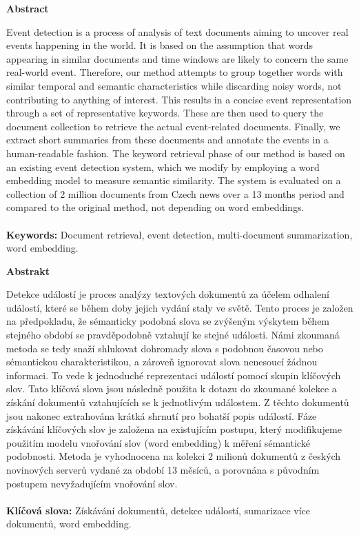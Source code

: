 \thispagestyle{plain}

\begin{center}
	\Large
	\textbf{Abstract}
\end{center}

Event detection is a process of analysis of text documents aiming to uncover real events happening in the world. It is based on the assumption that words appearing in similar documents and time windows are likely to concern the same real-world event. Therefore, our method attempts to group together words with similar temporal and semantic characteristics while discarding noisy words, not contributing to anything of interest. This results in a concise event representation through a set of representative keywords. These are then used to query the document collection to retrieve the actual event-related documents. Finally, we extract short summaries from these documents and annotate the events in a human-readable fashion. The keyword retrieval phase of our method is based on an existing event detection system, which we modify by employing a word embedding model to measure semantic similarity. The system is evaluated on a collection of 2 million documents from Czech news over a 13 months period and compared to the original method, not depending on word embeddings.
\\
\\
\textbf{Keywords:} Document retrieval, event detection, multi-document summarization, word embedding.

\hfill

\begin{center}
	\Large
	\textbf{Abstrakt}
\end{center}

Detekce událostí je proces analýzy textových dokumentů za účelem odhalení událostí, které se během doby jejich vydání staly ve světě. Tento proces je založen na předpokladu, že sémanticky podobná slova se zvýšeným výskytem během stejného období se pravděpodobně vztahují ke stejné události. Námi zkoumaná metoda se tedy snaží shlukovat dohromady slova s podobnou časovou nebo sémantickou charakteristikou, a zároveň ignorovat slova nenesoucí žádnou informaci. To vede k jednoduché reprezentaci událostí pomocí skupin klíčových slov. Tato klíčová slova jsou následně použita k dotazu do zkoumané kolekce a získání dokumentů vztahujících se k jednotlivým událostem. Z těchto dokumentů jsou nakonec extrahována krátká shrnutí pro bohatší popis událostí. Fáze získávání klíčových slov je založena na existujícím postupu, který modifikujeme použitím modelu vnořování slov (word embedding) k měření sémantické podobnosti. Metoda je vyhodnocena na kolekci 2 milionů dokumentů z českých novinových serverů vydané za období 13 měsíců, a porovnána s původním postupem nevyžadujícím vnořování slov.
\\
\\
\textbf{Klíčová slova:} Získávání dokumentů, detekce událostí, sumarizace více dokumentů, word embedding.